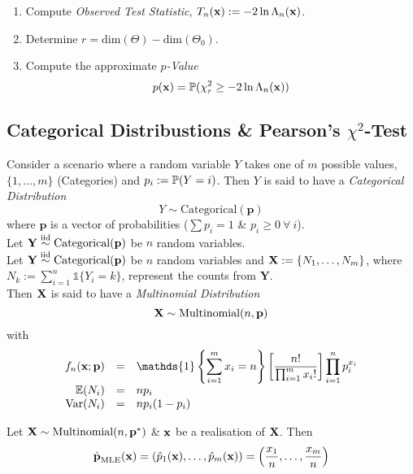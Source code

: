 \documentclass[11pt,a4paper]{article}
\begin{document}

\begin{enumerate}
	\item Compute \textit{Observed Test Statistic}, $T_n(\textbf{x}):=-2\ln\Lambda_n(\textbf{x})$.
	\item Determine $r=\text{dim}(\Theta)-\text{dim}(\Theta_0)$.
	\item Compute the approximate \textit{$p$-Value}
	$$p(\textbf{x})=\mathbb{P}(\chi^2_r\geq-2\ln\Lambda_n(\textbf{x}))$$
\end{enumerate}

\subsection{Categorical Distribustions \& Pearson's $\chi^2$-Test}

Consider a scenario where a random variable $Y$ takes one of $m$ possible values, $\{1,\dots,m\}$ (\ie Categories) and $p_i:=\mathbb{P}(Y=i)$. Then $Y$ is said to have a \textit{Categorical Distribution}
$$Y\sim\text{Categorical}(\textbf{p})$$
where $\textbf{p}$ is a vector of probabilities (\ie $\sum p_i=1$ \& $p_i\geq0\ \forall\ i$).\\

Let $\textbf{Y}\overset{\text{iid}}{\sim}\text{Categorical}(\textbf{p})$ be $n$ random variables.\\

Let $\textbf{Y}\overset{\text{iid}}{\sim}\text{Categorical}(\textbf{p})$ be $n$ random variables and $\textbf{X}:=\{N_1,\dots,N_m\}$, where ${N_k:=\sum_{i=1}^n\mathds{1}\{Y_i=k\}}$, represent the counts from $\textbf{Y}$.\\
Then $\textbf{X}$ is said to have a \textit{Multinomial Distribution}
$$\textbf{X}\sim\text{Multinomial}(n,\textbf{p})$$
with
\[\begin{array}{rcl}
f_n(\x;\textbf{p})&=&{\displaystyle\mathds{1}\left\{\sum_{i=1}^mx_i=n\right\}\left[\dfrac{n!}{\prod_{i=1}^mx_i!}\right]\prod_{i=1}^np_i^{x_i}}\\
\expect(N_i)&=&np_i\\
\var(N_i)&=&np_i(1-p_i)
\end{array}\]

Let $\textbf{X}\sim\text{Multinomial}(n,\textbf{p}^*)$ \& $\textbf{x}$ be a realisation of $\textbf{X}$. Then
$$\hat{\textbf{p}}_\text{MLE}(\textbf{x})=(\hat{p}_1(\textbf{x}),\dots,\hat{p}_m(\textbf{x}))=\left(\frac{x_1}{n},\dots,\frac{x _m}{n}\right)$$
\end{document}
